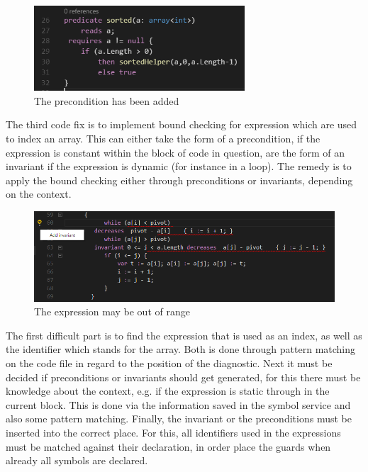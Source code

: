   \begin{figure}[H]
	\centering
	\includegraphics[width=0.7\textwidth]{img/nullCheckApplied}
	\caption{The precondition has been added}
	\label{fig:nullcheckapplied}
\end{figure}
The third code fix is to implement bound checking for expression which are used to index an array. This can either take the form of a precondition, if the expression is constant within the block of code in question, are the form of an invariant if the expression is dynamic (for instance in a loop).
The remedy is to apply the bound checking either through preconditions or invariants, depending on the context.
  \begin{figure}[H]
	\centering
	\includegraphics[width=1\textwidth]{img/indexOutRangeDiag}
	\caption{The expression may be out of range}
	\label{fig:indexOutOfRange}
\end{figure}
The first difficult part is to find the expression that is used as an index, as well as the identifier which stands for the array. Both is done through pattern matching on the code file in regard to the position of the diagnostic. Next it must be decided if preconditions or invariants should get generated, for this there must be knowledge about the context, e.g. if the expression is static through in the current block. This is done via the information saved in the symbol service and also some pattern matching. \newline
Finally, the invariant or the preconditions must be inserted into the correct place. For this, all identifiers used in the expressions must be matched against their declaration, in order place the guards when already all symbols are declared. \newline
